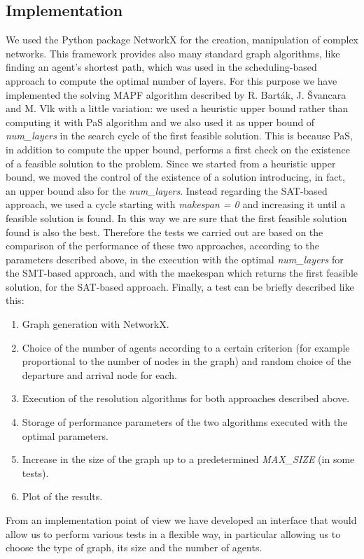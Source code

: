 \documentclass[12pt, a4paper, hidelinks]{article}
\numberwithin{equation}{section}
\begin{document}
\subsection{Implementation}\label{subsec:implementation}
We used the Python package NetworkX for the creation, manipulation of complex networks.
This framework provides also many standard graph algorithms, like finding an agent's shortest path, which was used in the scheduling-based approach to compute the optimal number of layers.
For this purpose we have implemented the solving MAPF algorithm described by R. Barták, J. Švancara and M. Vlk with a little variation:
we used a heuristic upper bound rather than computing it with PaS algorithm and we also used it as upper bound of \textit{num\_layers} in the search cycle of the first feasible solution.
This is because PaS, in addition to compute the upper bound, performs a first check on the existence of a feasible solution to the problem.
Since we started from a heuristic upper bound, we moved the control of the existence of a solution introducing, in fact, an upper bound also for the \textit{num\_layers}.
Instead regarding the SAT-based approach, we used a cycle starting with \textit{makespan = 0} and increasing it until a feasible solution is found.
In this way we are sure that the first feasible solution found is also the best.
Therefore the tests we carried out are based on the comparison of the performance of these two approaches, according to the parameters described above, in the execution with the optimal \textit{num\_layers} for the SMT-based approach, and with the maekespan which returns the first feasible solution, for the SAT-based approach.
Finally, a test can be briefly described like this:
\begin{enumerate}
    \item Graph generation with NetworkX\@.
    \item Choice of the number of agents according to a certain criterion (for example proportional to the number of nodes in the graph) and random choice of the departure and arrival node for each.
    \item Execution of the resolution algorithms for both approaches described above.
    \item Storage of performance parameters of the two algorithms executed with the optimal parameters.
    \item Increase in the size of the graph up to a predetermined \textit{MAX\_SIZE} (in some tests).
    \item Plot of the results.
\end{enumerate}
From an implementation point of view we have developed an interface that would allow us to perform various tests in a flexible way, in particular allowing us to choose the type of graph, its size and the number of agents.
\end{document}
